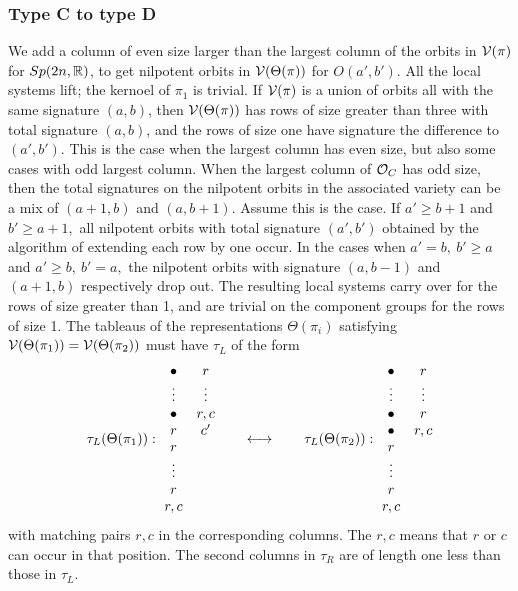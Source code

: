 \documentclass[11pt ,reqno]{amsart}
\begin{document}
\subsubsection{Type C to type D} We add a column of even size larger
than the largest column of the orbits in ${\mathcal V}(\pi)$ for $Sp(2n,{\mathbb R})$, to get nilpotent
orbits in ${\mathcal V}(\Theta(\pi))$ for $O(a',b').$  All the local systems
lift; the kernoel of $\pi_1$ is trivial. If ${\mathcal V}(\pi)$ is a
union of orbits all with the same signature $(a,b)$, then ${\mathcal V}(\Theta(\pi))$
has rows of size greater than three with total signature $(a,b)$, and
the rows of size one have signature the difference to  $(a',b').$
This is the case when the largest column has even size, but also some
cases with odd largest column. When the
largest column of $\mathcal O_C$ has odd size, then the total signatures on
the nilpotent orbits in the associated variety can be a mix of
$(a+1,b)$ and $(a,b+1).$ Assume this is the case.
If $a'\ge b+1$ and $b'\ge a+1,$ all nilpotent
orbits with total signature $(a',b')$ obtained by the algorithm of
extending each row by one occur. In the cases  when $a'=b,\ b'\ge a$ and  
$a'\ge b,\ b'=a,$ the nilpotent orbits with signature $(a,b-1)$ and
$(a+1,b)$ respectively drop out. The resulting local systems carry over for the
rows of size greater than 1, and are trivial on the component groups
for the rows of size 1. The tableaus of the representations
$\Theta(\pi_i)$ satisfying
${\mathcal V}(\Theta(\pi_1))={\mathcal V}(\Theta(\pi_2))$ must have $\tau_L$ of the form
$$
\tau_L(\Theta(\pi_1)):\ \begin{matrix}
\bullet&r\\
\vdots&\vdots \\
\bullet&r,c\\
r&c'\\
r&\\
\vdots& \\
r&\\
r,c&\\
\end{matrix}
\qquad\longleftrightarrow\qquad
\tau_L(\Theta(\pi_2)):\ \begin{matrix}
\bullet&r\\
\vdots&\vdots \\
\bullet&r\\
\bullet&r,c\\
r&\\
\vdots& \\
r&\\
r,c&\\
\end{matrix}
$$
with matching pairs $r,c$ in the corresponding columns. The $r,c$
means that $r$ or $c$ can occur in that position. The second
columns in $\tau_R$ are of length one less than those in $\tau_L.$
\end{document}
